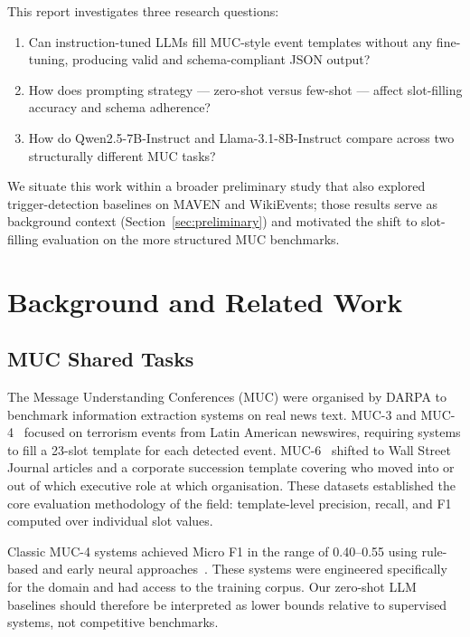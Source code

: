 \documentclass[11pt,a4paper]{article}
\begin{document}
This report investigates three research questions:
\begin{enumerate}
    \item Can instruction-tuned LLMs fill MUC-style event templates without any fine-tuning, producing valid and schema-compliant JSON output?
    \item How does prompting strategy — zero-shot versus few-shot — affect slot-filling accuracy and schema adherence?
    \item How do Qwen2.5-7B-Instruct and Llama-3.1-8B-Instruct compare across two structurally different MUC tasks?
\end{enumerate}

We situate this work within a broader preliminary study that also explored trigger-detection baselines on MAVEN and WikiEvents; those results serve as background context (Section~\ref{sec:preliminary}) and motivated the shift to slot-filling evaluation on the more structured MUC benchmarks.

\section{Background and Related Work}
\label{sec:background}

\subsection{MUC Shared Tasks}

The Message Understanding Conferences (MUC) were organised by DARPA to benchmark information extraction systems on real news text. MUC-3 and MUC-4~\cite{sundheim1992muc} focused on terrorism events from Latin American newswires, requiring systems to fill a 23-slot template for each detected event. MUC-6~\cite{grishman1996muc6} shifted to Wall Street Journal articles and a corporate succession template covering who moved into or out of which executive role at which organisation. These datasets established the core evaluation methodology of the field: template-level precision, recall, and F1 computed over individual slot values.

Classic MUC-4 systems achieved Micro F1 in the range of 0.40--0.55 using rule-based and early neural approaches~\cite{sundheim1992muc}. These systems were engineered specifically for the domain and had access to the training corpus. Our zero-shot LLM baselines should therefore be interpreted as lower bounds relative to supervised systems, not competitive benchmarks.
\end{document}
